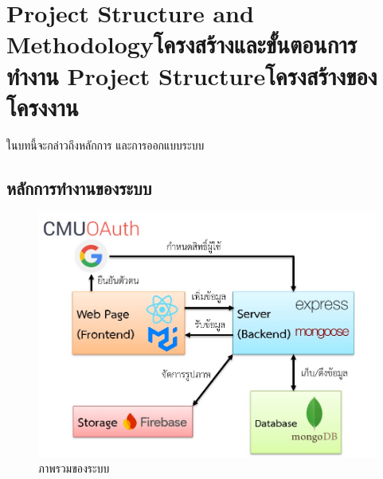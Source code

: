 \chapter{\ifproject%
\ifenglish Project Structure and Methodology\else โครงสร้างและขั้นตอนการทำงาน\fi
\else%
\ifenglish Project Structure\else โครงสร้างของโครงงาน\fi
\fi
}


ในบทนี้จะกล่าวถึงหลักการ และการออกแบบระบบ

\makeatletter


\makeatother

\section{หลักการทำงานของระบบ}

\begin{figure}[h!]
\begin{center}
\includegraphics[scale=0.6]{public/sys-overview.jpg}
\end{center}
\caption[ภาพรวมของระบบ]{ภาพรวมของระบบ}
\label{fig:sys-overview}
\end{figure}

